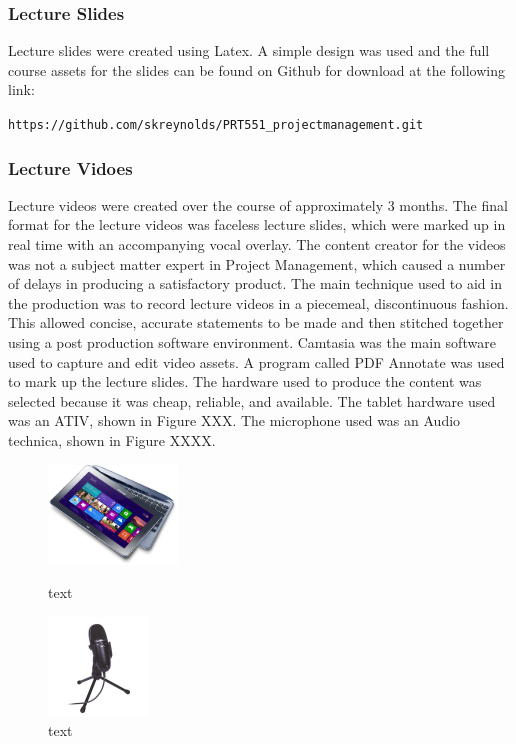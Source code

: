 \documentclass[a4paper]{article}
\begin{document}
\subsubsection{Lecture Slides}
Lecture slides were created using Latex. A simple design was used and the full course assets for the slides can be found on Github for download at the following link:\\
\begin{center}
\verb|https://github.com/skreynolds/PRT551_projectmanagement.git|
\end{center}

\subsubsection{Lecture Vidoes}
Lecture videos were created over the course of approximately 3 months. The final format for the lecture videos was faceless lecture slides, which were marked up in real time with an accompanying vocal overlay. The content creator for the videos was not a subject matter expert in Project Management, which caused a number of delays in producing a satisfactory product. The main technique used to aid in the production was to record lecture videos in a piecemeal, discontinuous fashion. This allowed concise, accurate statements to be made and then stitched together using a post production software environment. Camtasia was the main software used to capture and edit video assets. A program called PDF Annotate was used to mark up the lecture slides. The hardware used to produce the content was selected because it was cheap, reliable, and available. The tablet hardware used was an ATIV, shown in Figure XXX. The microphone used was an Audio technica, shown in Figure XXXX.

\begin{figure}[h]
\begin{minipage}{0.45\textwidth}
\centering
\includegraphics[height=100px]{ativ}
\caption{text}
\end{minipage}
\hspace{1cm}
\begin{minipage}{0.45\textwidth}
\centering
\includegraphics[height=100px]{microphone}
\caption{text}
\end{minipage}
\end{figure}
\end{document}
